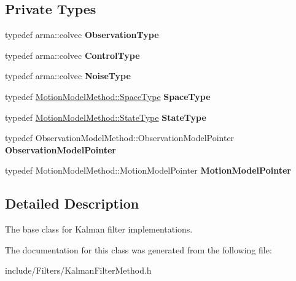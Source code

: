 \subsection*{\-Private \-Types}
\begin{DoxyCompactItemize}
\item 
\hypertarget{class_kalman_filter_method_a2718a343b6cf3edf6c8226fe64e9d468}{typedef arma\-::colvec {\bfseries \-Observation\-Type}}\label{class_kalman_filter_method_a2718a343b6cf3edf6c8226fe64e9d468}

\item 
\hypertarget{class_kalman_filter_method_adbc3ad1e37351d9131606dd0b7be1bc5}{typedef arma\-::colvec {\bfseries \-Control\-Type}}\label{class_kalman_filter_method_adbc3ad1e37351d9131606dd0b7be1bc5}

\item 
\hypertarget{class_kalman_filter_method_aeeec5cac3998634d89ff52570dd087a5}{typedef arma\-::colvec {\bfseries \-Noise\-Type}}\label{class_kalman_filter_method_aeeec5cac3998634d89ff52570dd087a5}

\item 
\hypertarget{class_kalman_filter_method_a9fad30fff8a91e24a894d284ffab38e8}{typedef \*
\hyperlink{class_s_e2_belief_space}{\-Motion\-Model\-Method\-::\-Space\-Type} {\bfseries \-Space\-Type}}\label{class_kalman_filter_method_a9fad30fff8a91e24a894d284ffab38e8}

\item 
\hypertarget{class_kalman_filter_method_a26f4e426a422c85e1ad9096180a0e240}{typedef \*
\hyperlink{class_s_e2_belief_space_1_1_state_type}{\-Motion\-Model\-Method\-::\-State\-Type} {\bfseries \-State\-Type}}\label{class_kalman_filter_method_a26f4e426a422c85e1ad9096180a0e240}

\item 
\hypertarget{class_kalman_filter_method_a353dd8a63c75605e197382224cca2f7e}{typedef \*
\-Observation\-Model\-Method\-::\-Observation\-Model\-Pointer {\bfseries \-Observation\-Model\-Pointer}}\label{class_kalman_filter_method_a353dd8a63c75605e197382224cca2f7e}

\item 
\hypertarget{class_kalman_filter_method_a9f792b6e5b6e7fc97fab550ce5e7440e}{typedef \*
\-Motion\-Model\-Method\-::\-Motion\-Model\-Pointer {\bfseries \-Motion\-Model\-Pointer}}\label{class_kalman_filter_method_a9f792b6e5b6e7fc97fab550ce5e7440e}

\end{DoxyCompactItemize}


\subsection{\-Detailed \-Description}
\-The base class for \-Kalman filter implementations. 

\-The documentation for this class was generated from the following file\-:\begin{DoxyCompactItemize}
\item 
include/\-Filters/\-Kalman\-Filter\-Method.\-h\end{DoxyCompactItemize}
